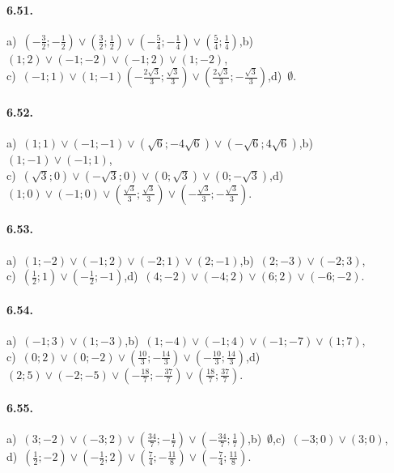 \paragraph{6.51.} a)~$\left(-\frac 3 2;-\frac 1 2\right)\vee\left(\frac 3 2;\frac 1 2\right)\vee\left(-\frac 5 4;-\frac 1 4\right)\vee\left(\frac 5 4;\frac 1 4\right)$,\quad b)~$(1;2)\vee(-1;-2)\vee (-1;2)\vee (1;-2)$,\protect\\
\quad c)~$(-1;1)\vee (1;-1)\left(-\frac{2\sqrt 3} 3;\frac{\sqrt 3} 3\right)\vee\left(\frac{2\sqrt 3} 3;-\frac{\sqrt 3} 3\right)$,\quad d)~$\emptyset$.

\paragraph{6.52.} a)~$(1;1)\vee(-1;-1)\vee\left(\sqrt 6;-4\sqrt 6\right)\vee\left(-\sqrt 6;4\sqrt 6\right)$,\quad b)~$(1;-1)\vee(-1;1)$,\protect\\
\quad c)~$(\sqrt 3;0)\vee (-\sqrt 3;0)\vee (0;\sqrt 3)\vee (0;-\sqrt 3)$,\quad d)~$(1;0)\vee (-1;0)\vee\left(\frac{\sqrt 3} 3;\frac{\sqrt 3} 3\right)\vee\left(-\frac{\sqrt 3} 3;-\frac{\sqrt 3} 3\right)$.

\paragraph{6.53.} a)~$(1;-2)\vee(-1;2)\vee (-2;1)\vee (2;-1)$,\quad b)~$(2;-3)\vee(-2;3)$,\protect\\
\quad c)~$\left(\frac 1 2;1\right)\vee \left(-\frac 1 2;-1\right)$,\quad d)~$(4;-2)\vee(-4;2)\vee (6;2)\vee (-6;-2)$.

\paragraph{6.54.} a)~$(-1;3)\vee(1;-3)$,\quad b)~$(1;-4)\vee(-1;4)\vee (-1;-7)\vee (1;7)$,\protect\\
\quad c)~$(0;2)\vee (0;-2)\vee \left(\frac{10} 3;-\frac{14} 3\right)\vee \left(-\frac{10} 3;\frac{14} 3\right)$,\quad d)~$(2;5)\vee (-2;-5)\vee \left(-\frac{18} 7;-\frac{37} 7\right)\vee \left(\frac{18} 7;\frac{37} 7\right)$.

\paragraph{6.55.} a)~$(3;-2)\vee(-3;2)\vee\left(\frac{34} 7;-\frac 1 7\right)\vee \left(-\frac{34} 7;\frac 1 7\right)$,\quad b)~$\emptyset$,\quad c)~$(-3;0)\vee(3;0)$,\protect\\
\quad d)~$\left(\frac 1 2;-2\right)\vee\left(-\frac 1 2;2\right)\vee\left(\frac 7 4;-\frac{11} 8\right)\vee\left(-\frac 7 4;\frac{11} 8\right)$.

